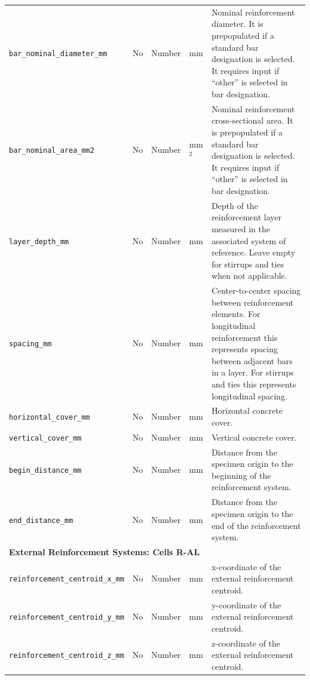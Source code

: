 \documentclass[11pt]{book}
\begin{document}
\begin{longtable}{p{}p{}p{}p{}p{}}
\texttt{bar\_nominal\_diameter\_mm} &
No &
Number &
mm &
Nominal reinforcement diameter. It is prepopulated if a standard bar designation is selected. It requires input if ``other'' is selected in bar designation.\\

\texttt{bar\_nominal\_area\_mm2} &
No &
Number &
mm$^2$ &
Nominal reinforcement cross-sectional area. It is prepopulated if a standard bar designation is selected. It requires input if ``other'' is selected in bar designation.\\

\texttt{layer\_depth\_mm} &
No &
Number &
mm &
Depth of the reinforcement layer measured in the associated system of reference. Leave empty for stirrups and ties when not applicable. \\

\texttt{spacing\_mm} &
No &
Number &
mm &
Center-to-center spacing between reinforcement elements. For longitudinal reinforcement this represents spacing between adjacent bars in a layer. For stirrups and ties this represents longitudinal spacing. \\

\texttt{horizontal\_cover\_mm} &
No &
Number &
mm &
Horizontal concrete cover. \\

\texttt{vertical\_cover\_mm} &
No &
Number &
mm &
Vertical concrete cover. \\

\texttt{begin\_distance\_mm} &
No &
Number &
mm &
Distance from the specimen origin to the beginning of the reinforcement system. \\

\texttt{end\_distance\_mm} &
No &
Number &
mm &
Distance from the specimen origin to the end of the reinforcement system. \\

\hline
\multicolumn{5}{l}{\textbf{External Reinforcement Systems: Cells R-AL}} \\
\hline

\texttt{reinforcement\_centroid\_x\_mm} &
No &
Number &
mm &
x-coordinate of the external reinforcement centroid. \\

\texttt{reinforcement\_centroid\_y\_mm} &
No &
Number &
mm &
y-coordinate of the external reinforcement centroid. \\

\texttt{reinforcement\_centroid\_z\_mm} &
No &
Number &
mm &
z-coordinate of the external reinforcement centroid. \\


\end{longtable}
\end{document}
